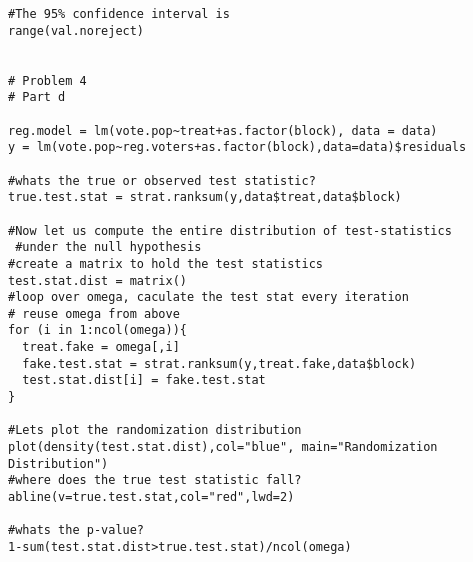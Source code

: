 \documentclass{article}
\begin{document}
\begin{verbatim}
#The 95% confidence interval is
range(val.noreject)


# Problem 4
# Part d
     
reg.model = lm(vote.pop~treat+as.factor(block), data = data) 
y = lm(vote.pop~reg.voters+as.factor(block),data=data)$residuals   

#whats the true or observed test statistic?
true.test.stat = strat.ranksum(y,data$treat,data$block) 

#Now let us compute the entire distribution of test-statistics 
 #under the null hypothesis
#create a matrix to hold the test statistics
test.stat.dist = matrix()
#loop over omega, caculate the test stat every iteration
# reuse omega from above
for (i in 1:ncol(omega)){
  treat.fake = omega[,i]
  fake.test.stat = strat.ranksum(y,treat.fake,data$block)
  test.stat.dist[i] = fake.test.stat
}      

#Lets plot the randomization distribution
plot(density(test.stat.dist),col="blue", main="Randomization Distribution")
#where does the true test statistic fall?
abline(v=true.test.stat,col="red",lwd=2)

#whats the p-value?
1-sum(test.stat.dist>true.test.stat)/ncol(omega)                

\end{verbatim}
\end{document}
